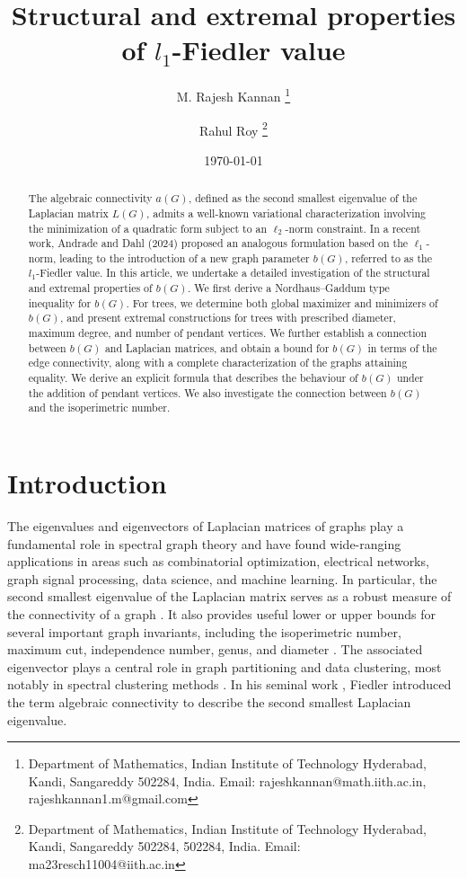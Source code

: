 \documentclass[12pt]{article}
\title{Structural and extremal properties of $l_1$-Fiedler value }
\author{
M. Rajesh Kannan \thanks{ Department of Mathematics, Indian Institute of Technology Hyderabad, Kandi, Sangareddy 502284, India. Email: rajeshkannan@math.iith.ac.in, rajeshkannan1.m@gmail.com} \and 
Rahul Roy 
\thanks{ Department of Mathematics, Indian Institute of Technology Hyderabad, Kandi, Sangareddy 502284, 502284, India. Email: ma23resch11004@iith.ac.in } 
}
\date{\today}
\begin{document}
\maketitle

\begin{abstract}
The algebraic connectivity $a(G)$, defined as the second smallest eigenvalue of the Laplacian matrix $L(G)$, admits a well-known variational characterization involving the minimization of a quadratic form subject to an $\ell_{2}$-norm constraint. In a recent work, Andrade and Dahl (2024) proposed an analogous formulation based on the $\ell_{1}$-norm, leading to the introduction of a new graph parameter $b(G)$, referred to as the $l_1$-Fiedler value. In this article, we undertake a detailed investigation of the structural and extremal properties of $b(G)$. We first derive a Nordhaus--Gaddum type inequality for $b(G)$. For trees, we determine both global maximizer and minimizers of $b(G)$, and present extremal constructions for trees with prescribed diameter, maximum degree, and number of pendant vertices. We further establish a connection between $b(G)$ and Laplacian matrices, and obtain a bound for $b(G)$ in terms of the edge connectivity, along with a complete characterization of the graphs attaining equality. We derive an explicit formula that describes the behaviour of $b(G)$ under the addition of pendant vertices. We also investigate the connection between $b(G)$ and the isoperimetric number.

\end{abstract}
\section{Introduction}

The eigenvalues and eigenvectors of Laplacian matrices of graphs play a fundamental role in spectral graph theory and have found wide-ranging applications in areas such as combinatorial optimization, electrical networks, graph signal processing, data science, and machine learning. In particular, the second smallest eigenvalue of the Laplacian matrix serves as a robust measure of the connectivity of a graph \cite{alg-con}. It also provides useful lower or  upper bounds for several important graph invariants, including the isoperimetric number, maximum cut, independence number, genus, and diameter \cite{mohar-lap-sur-1, mohar-eigen-comb-opti, trevisan_spec-partition}. The associated eigenvector plays a central role in graph partitioning and data clustering, most notably in spectral clustering methods \cite{trevisan_spec-partition, ulrike-spectral}. In his seminal work \cite{alg-con}, Fiedler introduced the term algebraic connectivity to describe the second smallest Laplacian eigenvalue.
\end{document}
